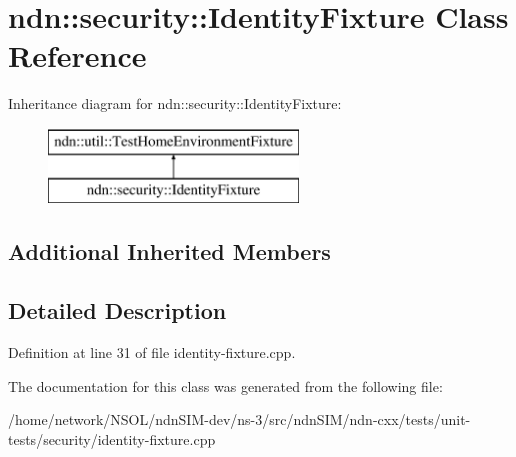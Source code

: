 \hypertarget{classndn_1_1security_1_1IdentityFixture}{}\section{ndn\+:\+:security\+:\+:Identity\+Fixture Class Reference}
\label{classndn_1_1security_1_1IdentityFixture}
Inheritance diagram for ndn\+:\+:security\+:\+:Identity\+Fixture\+:\begin{figure}[H]
\begin{center}
\leavevmode
\includegraphics[height=2.000000cm]{classndn_1_1security_1_1IdentityFixture}
\end{center}
\end{figure}
\subsection*{Additional Inherited Members}


\subsection{Detailed Description}


Definition at line 31 of file identity-\/fixture.\+cpp.



The documentation for this class was generated from the following file\+:\begin{DoxyCompactItemize}
\item 
/home/network/\+N\+S\+O\+L/ndn\+S\+I\+M-\/dev/ns-\/3/src/ndn\+S\+I\+M/ndn-\/cxx/tests/unit-\/tests/security/identity-\/fixture.\+cpp\end{DoxyCompactItemize}
